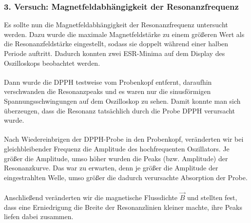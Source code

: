 \documentclass[a4paper,titlepage]{scrartcl}
\numberwithin{equation}{section}
\begin{document}
\subsubsection{3. Versuch: Magnetfeldabhängigkeit der Resonanzfrequenz}
Es sollte nun die Magnetfeldabhängigkeit der Resonanzfrequenz untersucht werden. Dazu wurde die maximale Magnetfeldstärke zu einem größeren Wert als die Resonanzfeldstärke eingestellt, sodass sie doppelt während einer halben Periode auftritt. Dadurch konnten zwei ESR-Minima auf dem Display des Oszilloskops beobachtet werden.\\ \\
Dann wurde die DPPH testweise vom Probenkopf entfernt, daraufhin verschwanden die Resonanzpeaks und es waren nur die sinusförmigen Spannungsschwingungen auf dem Oszilloskop zu sehen. Damit konnte man sich überzeugen, dass die Resonanz tatsächlich durch die Probe DPPH verursacht wurde.\\ \\
Nach Wiedereinbrigen der DPPH-Probe in den Probenkopf, veränderten wir bei gleichbleibender Frequenz die Amplitude des hochfrequenten Oszillators. Je größer die Amplitude, umso höher wurden die Peaks (bzw. Amplitude) der Resonanzkurve. Das war zu erwarten, denn je größer die Amplitude der eingestrahlten Welle, umso größer die dadurch verursachte Absorption der Probe.\\ \\
Anschließend veränderten wir die magnetische Flussdichte $\vec{B}$ und stellten fest, dass eine Erniedrigung die Breite der Resonanzlinien kleiner machte, ihre Peaks liefen dabei zusammen.
\end{document}
